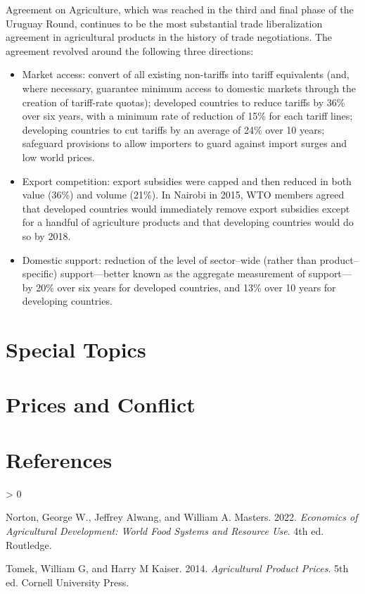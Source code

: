 \documentclass[
  oneside]{book}
\providecommand{\tightlist}{%
  \setlength{\itemsep}{0pt}\setlength{\parskip}{0pt}}
\newlength{\cslhangindent}
\newenvironment{CSLReferences}[2] %
 {%
  \setlength{\parindent}{0pt}
  \ifodd #1 \everypar{\setlength{\hangindent}{\cslhangindent}}\ignorespaces\fi
  \ifnum #2 > 0
  \setlength{\parskip}{#2\baselineskip}
  \fi
 }%
 {}
\begin{document}
Agreement on Agriculture, which was reached in the third and final phase of the Uruguay Round, continues to be the most substantial trade liberalization agreement in agricultural products in the history of trade negotiations. The agreement revolved around the following three directions:

\begin{itemize}
\tightlist
\item
  Market access: convert of all existing non-tariffs into tariff equivalents (and, where necessary, guarantee minimum access to domestic markets through the creation of tariff-rate quotas); developed countries to reduce tariffs by 36\% over six years, with a minimum rate of reduction of 15\% for each tariff lines; developing countries to cut tariffs by an average of 24\% over 10 years; safeguard provisions to allow importers to guard against import surges and low world prices.
\item
  Export competition: export subsidies were capped and then reduced in both value (36\%) and volume (21\%). In Nairobi in 2015, WTO members agreed that developed countries would immediately remove export subsidies except for a handful of agriculture products and that developing countries would do so by 2018.
\item
  Domestic support: reduction of the level of sector--wide (rather than product--specific) support---better known as the aggregate measurement of support---by 20\% over six years for developed countries, and 13\% over 10 years for developing countries.
\end{itemize}

\hypertarget{special-topics}{%
\chapter*{Special Topics}\label{special-topics}}

\hypertarget{prices-and-conflict}{%
\chapter{Prices and Conflict}\label{prices-and-conflict}}

\hypertarget{references}{%
\chapter*{References}\label{references}}

\hypertarget{refs}{}
\begin{CSLReferences}{1}{0}
\leavevmode\hypertarget{ref-norton2022}{}%
Norton, George W., Jeffrey Alwang, and William A. Masters. 2022. \emph{Economics of Agricultural Development: World Food Systems and Resource Use}. 4th ed. Routledge.

\leavevmode\hypertarget{ref-tomek2014}{}%
Tomek, William G, and Harry M Kaiser. 2014. \emph{Agricultural Product Prices}. 5th ed. Cornell University Press.

\end{CSLReferences}
\end{document}
